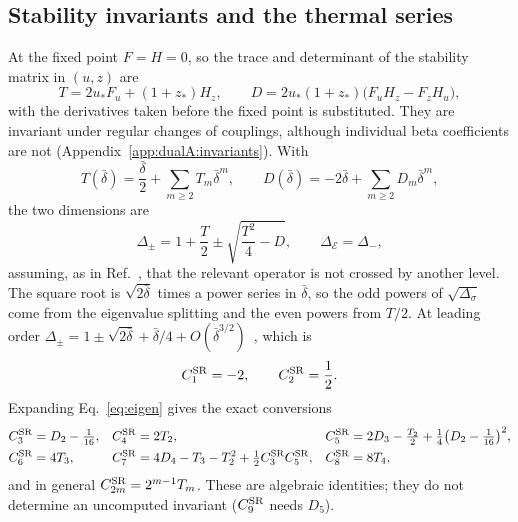 \documentclass[11pt,a4paper]{article}
\numberwithin{equation}{section}
\newcommand{\De}{\Delta_{\mathcal E}}
\newcommand{\Ds}{\Delta_\sigma}
\newcommand{\CSR}{C^{\rm SR}}
\newcommand{\db}{\bar\delta}
\begin{document}
\subsection{Stability invariants and the thermal series}\label{sec:invariants}
At the fixed point $F=H=0$, so the trace and determinant of the stability matrix in $(u,z)$ are
\begin{equation}
 T=2u_*F_u+(1+z_*)H_z,\qquad D=2u_*(1+z_*)\bigl(F_uH_z-F_zH_u\bigr),
\end{equation}
with the derivatives taken before the fixed point is substituted. They are invariant under regular changes of
couplings, although individual beta coefficients are not (Appendix~\ref{app:dualA:invariants}). With
\begin{equation}
 T(\db)=\frac{\db}{2}+\sum_{m\ge2}T_m\db^m,\qquad D(\db)=-2\db+\sum_{m\ge2}D_m\db^m,
\end{equation}
the two dimensions are
\begin{equation}
 \Delta_\pm=1+\frac T2\pm\sqrt{\frac{T^2}{4}-D},\qquad \De=\Delta_-,
 \label{eq:eigen}
\end{equation}
assuming, as in Ref.~\cite{Paper}, that the relevant operator is not crossed by another level. The square root is
$\sqrt{2\db}$ times a power series in $\db$, so the odd powers of $\sqrt{\Ds}$ come from the eigenvalue splitting and
the even powers from $T/2$. At leading order $\Delta_\pm=1\pm\sqrt{2\db}+\db/4+O(\db^{3/2})$~\cite{Benedetti:2025nzp},
which is
\begin{equation}
 \CSR_1=-2,\qquad \CSR_2=\frac12.
\end{equation}
Expanding Eq.~\eqref{eq:eigen} gives the exact conversions
\begin{equation}
\begin{aligned}
 \CSR_3&=D_2-\tfrac1{16}, & \CSR_4&=2T_2, & \CSR_5&=2D_3-\tfrac{T_2}{2}+\tfrac14\bigl(D_2-\tfrac1{16}\bigr)^2,\\
 \CSR_6&=4T_3, & \CSR_7&=4D_4-T_3-T_2^2+\tfrac12\CSR_3\CSR_5, & \CSR_8&=8T_4,
\end{aligned}
\label{eq:conv}
\end{equation}
and in general $\CSR_{2m}=2^{m-1}T_m$. These are algebraic identities; they do not determine an uncomputed invariant
($\CSR_9$ needs $D_5$).
\end{document}
